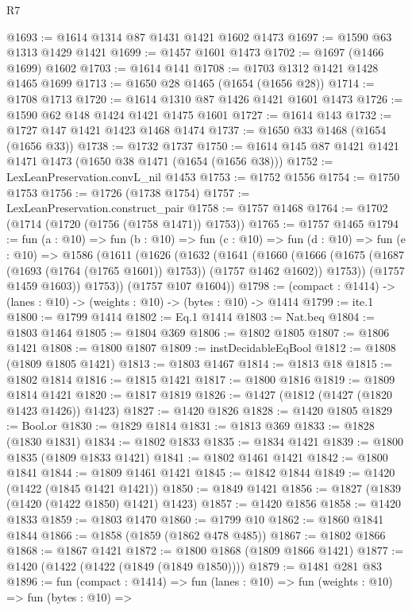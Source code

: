 \begin{lexlean}{R7}
\begin{coremodule}
@1693 := @1614 @1314 @87 @1431 @1421 @1602 @1473
@1697 := @1590 @63 @1313 @1429 @1421
@1699 := @1457 @1601 @1473
@1702 := @1697 (@1466 @1699) @1602
@1703 := @1614 @141
@1708 := @1703 @1312 @1421 @1428 @1465 @1699
@1713 := @1650 @28 @1465 (@1654 (@1656 @28))
@1714 := @1708 @1713
@1720 := @1614 @1310 @87 @1426 @1421 @1601 @1473
@1726 := @1590 @62 @148 @1424 @1421 @1475 @1601
@1727 := @1614 @143
@1732 := @1727 @147 @1421 @1423 @1468 @1474
@1737 := @1650 @33 @1468 (@1654 (@1656 @33))
@1738 := @1732 @1737
@1750 := @1614 @145 @87 @1421 @1421 @1471 @1473 (@1650 @38 @1471 (@1654 (@1656 @38)))
@1752 := LexLeanPreservation.convL_nil @1453
@1753 := @1752 @1556
@1754 := @1750 @1753
@1756 := @1726 (@1738 @1754)
@1757 := LexLeanPreservation.construct_pair
@1758 := @1757 @1468
@1764 := @1702 (@1714 (@1720 (@1756 (@1758 @1471)) @1753))
@1765 := @1757 @1465
@1794 := fun (a : @10) =>
  fun (b : @10) =>
  fun (c : @10) =>
  fun (d : @10) =>
  fun (e : @10) =>
  @1586
    (@1611
      (@1626
        (@1632
          (@1641
            (@1660
              (@1666 (@1675 (@1687 (@1693 (@1764 (@1765 @1601)) @1753)) (@1757 @1462 @1602)) @1753))
            (@1757 @1459 @1603))
          @1753))
      (@1757 @107 @1604))
@1798 := (compact : @1414) -> (lanes : @10) -> (weights : @10) -> (bytes : @10) -> @1414
@1799 := ite.{1}
@1800 := @1799 @1414
@1802 := Eq.{1} @1414
@1803 := Nat.beq
@1804 := @1803 @1464
@1805 := @1804 @369
@1806 := @1802 @1805
@1807 := @1806 @1421
@1808 := @1800 @1807
@1809 := instDecidableEqBool
@1812 := @1808 (@1809 @1805 @1421)
@1813 := @1803 @1467
@1814 := @1813 @18
@1815 := @1802 @1814
@1816 := @1815 @1421
@1817 := @1800 @1816
@1819 := @1809 @1814 @1421
@1820 := @1817 @1819
@1826 := @1427 (@1812 (@1427 (@1820 @1423 @1426)) @1423)
@1827 := @1420 @1826
@1828 := @1420 @1805
@1829 := Bool.or
@1830 := @1829 @1814
@1831 := @1813 @369
@1833 := @1828 (@1830 @1831)
@1834 := @1802 @1833
@1835 := @1834 @1421
@1839 := @1800 @1835 (@1809 @1833 @1421)
@1841 := @1802 @1461 @1421
@1842 := @1800 @1841
@1844 := @1809 @1461 @1421
@1845 := @1842 @1844
@1849 := @1420 (@1422 (@1845 @1421 @1421))
@1850 := @1849 @1421
@1856 := @1827 (@1839 (@1420 (@1422 @1850) @1421) @1423)
@1857 := @1420 @1856
@1858 := @1420 @1833
@1859 := @1803 @1470
@1860 := @1799 @10
@1862 := @1860 @1841 @1844
@1866 := @1858 (@1859 (@1862 @478 @485))
@1867 := @1802 @1866
@1868 := @1867 @1421
@1872 := @1800 @1868 (@1809 @1866 @1421)
@1877 := @1420 (@1422 (@1422 (@1849 (@1849 @1850))))
@1879 := @1481 @281 @83
@1896 := fun (compact : @1414) =>
  fun (lanes : @10) =>
  fun (weights : @10) =>
  fun (bytes : @10) =>

\end{coremodule}
\end{lexlean}
